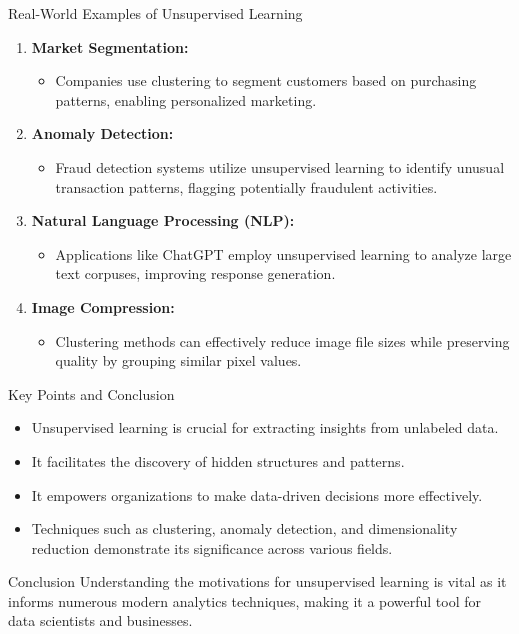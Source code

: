 \documentclass[aspectratio=169]{beamer}
\begin{document}
\begin{frame}[fragile]{Real-World Examples of Unsupervised Learning}
    \begin{enumerate}
        \item \textbf{Market Segmentation:} 
        \begin{itemize}
            \item Companies use clustering to segment customers based on purchasing patterns, enabling personalized marketing.
        \end{itemize}
        
        \item \textbf{Anomaly Detection:}
        \begin{itemize}
            \item Fraud detection systems utilize unsupervised learning to identify unusual transaction patterns, flagging potentially fraudulent activities.
        \end{itemize}
        
        \item \textbf{Natural Language Processing (NLP):}
        \begin{itemize}
            \item Applications like ChatGPT employ unsupervised learning to analyze large text corpuses, improving response generation.
        \end{itemize}
        
        \item \textbf{Image Compression:}
        \begin{itemize}
            \item Clustering methods can effectively reduce image file sizes while preserving quality by grouping similar pixel values.
        \end{itemize}
    \end{enumerate}
\end{frame}

\begin{frame}[fragile]{Key Points and Conclusion}
    \begin{itemize}
        \item Unsupervised learning is crucial for extracting insights from unlabeled data.
        \item It facilitates the discovery of hidden structures and patterns.
        \item It empowers organizations to make data-driven decisions more effectively.
        \item Techniques such as clustering, anomaly detection, and dimensionality reduction demonstrate its significance across various fields.
    \end{itemize}

    \begin{block}{Conclusion}
        Understanding the motivations for unsupervised learning is vital as it informs numerous modern analytics techniques, making it a powerful tool for data scientists and businesses.
    \end{block}
\end{frame}
\end{document}

